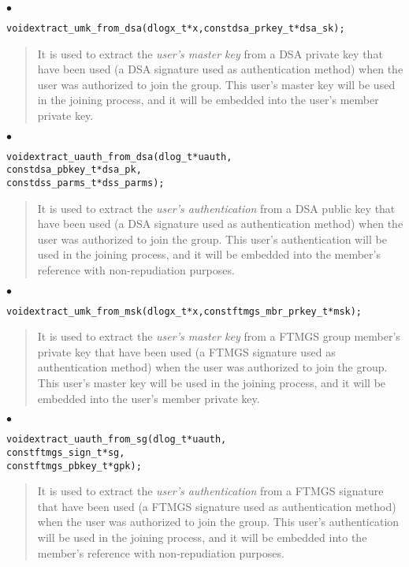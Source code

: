 \documentclass[a4paper]{article}
\newenvironment{api}%
{\noindent$\bullet$\hfill\begin{minipage}[t]{0.97\linewidth}\footnotesize\begin{alltt}}%
{\end{alltt}\end{minipage}}%
\begin{document}
\begin{api}
void extract_umk_from_dsa(dlogx_t* x, const dsa_prkey_t* dsa_sk);
\end{api}
\begin{quote}\footnotesize
It is used to extract the \emph{user's master key} from a DSA private
key that have been used (a DSA signature used as authentication
method) when the user was authorized to join the group. This user's
master key will be used in the joining process, and it will be
embedded into the user's member private key.
\end{quote}
\begin{api}
void extract_uauth_from_dsa(dlog_t* uauth,
                            const dsa_pbkey_t* dsa_pk,
                            const dss_parms_t* dss_parms);
\end{api}
\begin{quote}\footnotesize
It is used to extract the \emph{user's authentication} from a DSA
public key that have been used (a DSA signature used as authentication
method) when the user was authorized to join the group. This user's
authentication will be used in the joining process, and it will be
embedded into the member's reference with non-repudiation purposes.
\end{quote}
\begin{api}
void extract_umk_from_msk(dlogx_t* x, const ftmgs_mbr_prkey_t* msk);
\end{api}
\begin{quote}\footnotesize
It is used to extract the \emph{user's master key} from a FTMGS group
member's private key that have been used (a FTMGS signature used as
authentication method) when the user was authorized to join the
group. This user's master key will be used in the joining process, and
it will be embedded into the user's member private key.
\end{quote}
\begin{api}
void extract_uauth_from_sg(dlog_t* uauth,
                           const ftmgs_sign_t* sg,
                           const ftmgs_pbkey_t* gpk);
\end{api}
\begin{quote}\footnotesize
It is used to extract the \emph{user's authentication} from a FTMGS
signature that have been used (a FTMGS signature used as
authentication method) when the user was authorized to join the
group. This user's authentication will be used in the joining process,
and it will be embedded into the member's reference with
non-repudiation purposes.
\end{quote}
\end{document}
